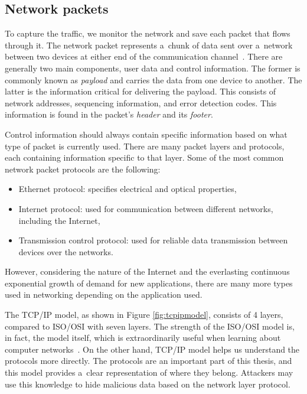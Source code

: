 \documentclass[
  printed,     %
  color,       %
  oneside,     %
  nosansbold,  %
  nocolorbold, %
  nolof,         %
  nolot,         %
]{fithesis4}
\begin{document}
\subsection{Network packets}

To capture the traffic, we monitor the network and save each packet that flows through it. The network packet represents a~chunk of data sent over a~network between two devices at either end of the communication channel~\cite{PacketMD39:online}. There are generally two main components, user data and control information. The former is commonly known as \textit{payload} and carries the data from one device to another. The latter is the information critical for delivering the payload. This consists of network addresses, sequencing information, and error detection codes. This information is found in the packet's \textit{header} and its \textit{footer}. 

Control information should always contain specific information based on what type of packet is currently used. There are many packet layers and protocols, each containing information specific to that layer. Some of the most common network packet protocols are the following:

\begin{itemize}
    \item Ethernet protocol: specifies electrical and optical properties,
    \item Internet protocol: used for communication between different networks, including the Internet,
    \item Transmission control protocol: used for reliable data transmission between devices over the networks.
\end{itemize}

However, considering the nature of the Internet and the everlasting continuous exponential growth of demand for new applications, there are many more types used in networking depending on the application used.

The TCP/IP model, as shown in Figure \ref{fig:tcpipmodel}, consists of 4 layers, compared to ISO/OSI with seven layers. The strength of the ISO/OSI model is, in fact, the model itself, which is extraordinarily useful when learning about computer networks~\cite{10.5555/2584507}. On the other hand, TCP/IP model helps us understand the protocols more directly. The protocols are an important part of this thesis, and this model provides a~clear representation of where they belong. Attackers may use this knowledge to hide malicious data based on the network layer protocol.
\end{document}
